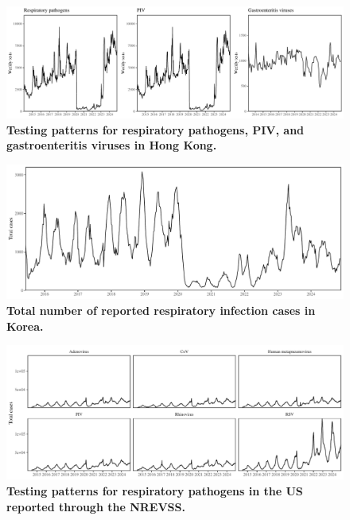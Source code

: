 \documentclass[12pt]{article}
\begin{document}
\pagebreak

\begin{figure}[!th]
\begin{center}
\includegraphics[width=\textwidth]{../figure_test/figure_test_hongkong.pdf}
\caption{
\textbf{Testing patterns for respiratory pathogens, PIV, and gastroenteritis viruses in Hong Kong.}
}
\end{center}
\end{figure}


\pagebreak

\begin{figure}[!th]
\begin{center}
\includegraphics[width=\textwidth]{../figure_test/figure_test_korea.pdf}
\caption{
\textbf{Total number of reported respiratory infection cases in Korea.}
}
\end{center}
\end{figure}

\pagebreak

\begin{figure}[!th]
\begin{center}
\includegraphics[width=\textwidth]{../figure_test/figure_test_nrevss.pdf}
\caption{
\textbf{Testing patterns for respiratory pathogens in the US reported through the NREVSS.}
}
\end{center}
\end{figure}

\pagebreak


\end{document}
